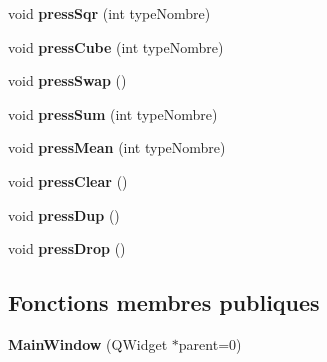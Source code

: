 \begin{DoxyCompactItemize}
\item 
\hypertarget{class_main_window_ad61a8b8a78c92453da2b55e4292e9d8c}{void {\bfseries press\-Sqr} (int type\-Nombre)}\label{class_main_window_ad61a8b8a78c92453da2b55e4292e9d8c}

\item 
\hypertarget{class_main_window_a3646c31c87248b33064cc83ad3b50f3c}{void {\bfseries press\-Cube} (int type\-Nombre)}\label{class_main_window_a3646c31c87248b33064cc83ad3b50f3c}

\item 
\hypertarget{class_main_window_a90f55dff8cd88ebb9ca51fbb45ff9572}{void {\bfseries press\-Swap} ()}\label{class_main_window_a90f55dff8cd88ebb9ca51fbb45ff9572}

\item 
\hypertarget{class_main_window_aad6db4cd90be3080ccfba45126f8314d}{void {\bfseries press\-Sum} (int type\-Nombre)}\label{class_main_window_aad6db4cd90be3080ccfba45126f8314d}

\item 
\hypertarget{class_main_window_af9af72599ae1edd0786d53b33548c02e}{void {\bfseries press\-Mean} (int type\-Nombre)}\label{class_main_window_af9af72599ae1edd0786d53b33548c02e}

\item 
\hypertarget{class_main_window_a7bfe416d75e010b19a746534be888500}{void {\bfseries press\-Clear} ()}\label{class_main_window_a7bfe416d75e010b19a746534be888500}

\item 
\hypertarget{class_main_window_a85c203aa98a11bff2fc1c04850c487f5}{void {\bfseries press\-Dup} ()}\label{class_main_window_a85c203aa98a11bff2fc1c04850c487f5}

\item 
\hypertarget{class_main_window_a7bf431a5544caa9134f78acaf4f5be96}{void {\bfseries press\-Drop} ()}\label{class_main_window_a7bf431a5544caa9134f78acaf4f5be96}

\end{DoxyCompactItemize}
\subsection*{Fonctions membres publiques}
\begin{DoxyCompactItemize}
\item 
\hypertarget{class_main_window_a8b244be8b7b7db1b08de2a2acb9409db}{{\bfseries Main\-Window} (Q\-Widget $\ast$parent=0)}\label{class_main_window_a8b244be8b7b7db1b08de2a2acb9409db}

\end{DoxyCompactItemize}
